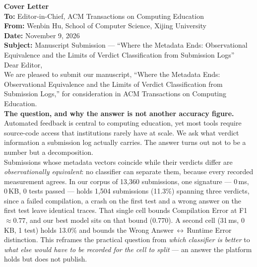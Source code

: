 \documentclass[11pt]{article}
\begin{document}
\vspace{-2ex}
\noindent\textbf{Cover Letter}\\[1ex]
\noindent\textbf{To:} Editor-in-Chief, ACM Transactions on Computing Education\\
\textbf{From:} Wenbin Hu, School of Computer Science, Xijing University\\
\textbf{Date:} November 9, 2026\\
\textbf{Subject:} Manuscript Submission --- ``Where the Metadata Ends: Observational Equivalence and the Limits of Verdict Classification from Submission Logs''\\[2ex]

\noindent Dear Editor,\\[1ex]

We are pleased to submit our manuscript, ``Where the Metadata Ends: Observational Equivalence and the Limits of Verdict Classification from Submission Logs,'' for consideration in ACM Transactions on Computing Education.\\[1ex]

\noindent\textbf{The question, and why the answer is not another accuracy figure.} Automated feedback is central to computing education, yet most tools require source-code access that institutions rarely have at scale. We ask what verdict information a submission log actually carries. The answer turns out not to be a number but a decomposition.\\[1ex]

Submissions whose metadata vectors coincide while their verdicts differ are \emph{observationally equivalent}: no classifier can separate them, because every recorded measurement agrees. In our corpus of 13,360 submissions, one signature --- 0\,ms, 0\,KB, 0 tests passed --- holds 1,504 submissions (11.3\%) spanning three verdicts, since a failed compilation, a crash on the first test and a wrong answer on the first test leave identical traces. That single cell bounds Compilation Error at F1 $\approx 0.77$, and our best model sits on that bound (0.770). A second cell (31\,ms, 0\,KB, 1 test) holds 13.0\% and bounds the Wrong Answer\,$\leftrightarrow$\,Runtime Error distinction. This reframes the practical question from \emph{which classifier is better} to \emph{what else would have to be recorded for the cell to split} --- an answer the platform holds but does not publish.\\[1ex]
\end{document}
